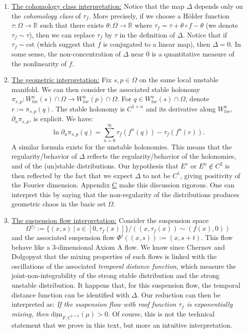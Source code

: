 \documentclass[a4paper]{article}
\theoremstyle{definition}
\begin{document}
\begin{enumerate}
\item \underline{The cohomology class interpretation:} Notice that the map $\Delta$ depends only on the \emph{cohomology class} of $\tau_f$. More precisely, if we choose a Hölder function $\tau:\Omega \rightarrow \mathbb{R}$ such that there exists $\theta:\Omega \rightarrow \mathbb{R}$ where $\tau_f = \tau + \theta \circ f - \theta$ (we denote $\tau_f \sim \tau$), then we can replace $\tau_f$ by $\tau$ in the definition of $\Delta$. Notice that if $\tau_f \sim \text{cst}$ (which suggest that $f$ is conjugated to a linear map), then $\Delta=0$. In some sense, the non-concentration of $\Delta$ near $0$ is a quantitative measure of the nonlinearity of $f$.
\item \underline{The geometric interpretation:} Fix $s,p \in \Omega$ on the same local unstable manifold. We can then consider the associated stable holonomy $\pi_{s,p} : W^u_{loc}(s) \cap \Omega \rightarrow W^u_{loc}(p) \cap \Omega $. For $q \in W^u_{loc}(s) \cap \Omega $, denote $r := \pi_{s,p}(q)$. The stable holonomy is $C^{1+\alpha}$ and its derivative along $W^u_{loc}$, $\partial_u \pi_{s,p}$, is explicit. We have:
$$ \ln \partial_u \pi_{s,p}(q) = \sum_{n=0}^\infty \tau_f(f^n(q)) - \tau_f(f^n(r)).$$
A similar formula exists for the unstable holonomies. This means that the regularity/behavior of $\Delta$ reflects the regularity/behavior of the holonomies, and of the (un)stable distributions. Our hypothesis that $E^s \text{ or } E^u \notin C^2$ is then reflected by the fact that we expect $\Delta$ to not be $C^1$, giving positivity of the Fourier dimension. Appendix \hyperref[ap:C]{C} make this discussion rigorous. One can interpret this by saying that the non-regularity of the distributions produces geometric chaos in the basic set $\Omega$. 
\item \underline{The suspension flow interpretation:} Consider the suspension space   $$\Omega^{\tau_f} := \{ (x,s) \ | \ s \in [0,\tau_f(x)] \}/((x,\tau_f(x)) \sim (f(x),0))$$ and the associated suspension flow $\Phi^t((x,s)) := (x,s+t)$. This flow behave like a 3-dimensional Axiom A flow. We know since Chernov and Dolgopyat \cite{Ch98,Do98,Do00,Do02} that the mixing properties of such flows is linked with the oscillations of the associated \emph{temporal distance function}, which measure the joint-non-integrability of the strong stable distribution and the strong unstable distribution. It happens that, for this suspension flow, the temporal distance function can be identified with $\Delta$. Our reduction can then be interpreted as: \emph{If the suspension flow with roof function $\tau_f$ is exponentially mixing, then $\underline{\text{dim}}_{F,C^{1+\alpha}}(\mu)>0$}. Of course, this is not the technical statement that we prove in this text, but more an intuitive interpretation. 
\end{enumerate}
\end{document}
